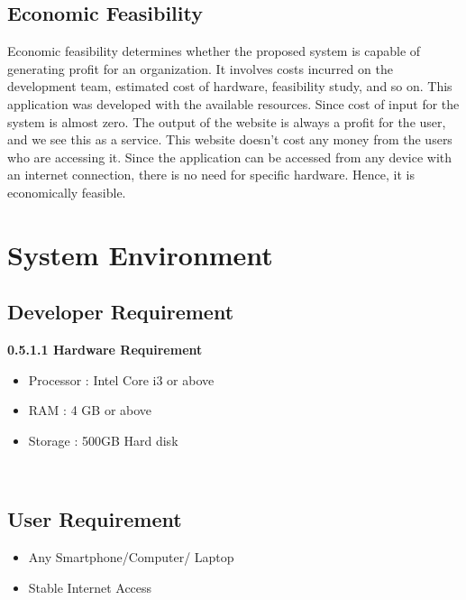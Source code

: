 \documentclass[a4paper,12pt,toc=flat]{report}
\begin{document}
{	\subsection{Economic Feasibility}
	\hspace*{12pt}Economic feasibility determines whether the proposed system is capable of generating profit for an organization. It involves costs incurred on the development team, estimated cost of hardware, feasibility study, and so on. This application was developed with the available resources. Since cost of input for the system is almost zero. The output of the website is always a profit for the user, and we see this as a service. This website doesn't cost any money from the users who are accessing it. Since the application can be accessed from any device with an internet connection, there is no need for specific hardware. Hence, it is economically feasible.
	\pagebreak
	
		
	\section{System Environment}
		
	\subsection{Developer Requirement}{
		
		{\bf 0.5.1.1 Hardware Requirement}{
			\begin{itemize}
				\item Processor : Intel Core i3 or above
				\item  RAM : 4 GB or above
				\item  Storage : 500GB Hard disk
			\end{itemize}
		}
		\\

	    }
	\subsection{User Requirement}{
		    \begin{itemize}
			    \item  Any Smartphone/Computer/ Laptop
			    \item  Stable Internet Access
	        \end{itemize}
	}
	}
\newpage
\end{document}
